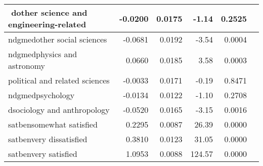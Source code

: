 \documentclass[12pt]{article}
\begin{document}
\begin{table}[H]
\begin{tabular}{|l|r|r|r|r|r|}
$$  dother science and engineering-related & -0.0200 & 0.0175 & -1.14 & 0.2525 \\  \hline
  ndgmedother social sciences & -0.0681 & 0.0192 & -3.54 & 0.0004 \\ \hline
  ndgmedphysics and astronomy & 0.0660 & 0.0185 & 3.58 & 0.0003 \\ \hline
  political and related sciences & -0.0033 & 0.0171 & -0.19 & 0.8471 \\ \hline
  ndgmedpsychology & -0.0134 & 0.0122 & -1.10 & 0.2708 \\ \hline
  dsociology and anthropology & -0.0520 & 0.0165 & -3.15 & 0.0016 \\ \hline
  satbensomewhat satisfied & 0.2295 & 0.0087 & 26.39 & 0.0000 \\ \hline
  satbenvery dissatisfied & 0.3810 & 0.0123 & 31.05 & 0.0000 \\ \hline
  satbenvery satisfied & 1.0953 & 0.0088 & 124.57 & 0.0000 \\ \hline
   \bottomrule
\end{tabular}
\end{table}
\end{document}
